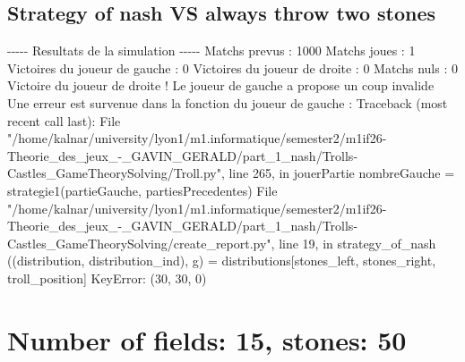 \documentclass{article}%
\begin{document}
\subsection{Strategy of nash VS always throw two stones}%
\label{subsec:Strategy of nash VS always throw two stones}%
{-}{-}{-}{-}{-} Resultats de la simulation {-}{-}{-}{-}{-}\newline%
		\newline%
Matchs prevus : 1000\newline%
Matchs joues : 1\newline%
\newline%
Victoires du joueur de gauche : 0\newline%
Victoires du joueur de droite : 0\newline%
Matchs nuls : 0\newline%
\newline%
Victoire du joueur de droite ! Le joueur de gauche a propose un coup invalide\newline%
Une erreur est survenue dans la fonction du joueur de gauche : \newline%
Traceback (most recent call last):\newline%
  File "/home/kalnar/university/lyon1/m1.informatique/semester2/m1if26{-}Theorie\_des\_jeux\_{-}\_GAVIN\_GERALD/part\_1\_nash/Trolls{-}Castles\_GameTheorySolving/Troll.py", line 265, in jouerPartie\newline%
    nombreGauche = strategie1(partieGauche, partiesPrecedentes)\newline%
  File "/home/kalnar/university/lyon1/m1.informatique/semester2/m1if26{-}Theorie\_des\_jeux\_{-}\_GAVIN\_GERALD/part\_1\_nash/Trolls{-}Castles\_GameTheorySolving/create\_report.py", line 19, in strategy\_of\_nash\newline%
    ((distribution, distribution\_ind), g) = distributions{[}stones\_left, stones\_right, troll\_position{]}\newline%
KeyError: (30, 30, 0)\newline%

%
\section{Number of fields: 15, stones: 50}%
\label{sec:Number of fields 15, stones 50}%
\end{document}
